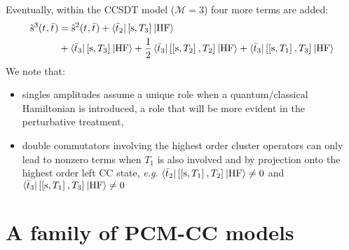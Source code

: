 Eventually, within the \acs{CCSDT} model ($\mathcal{M} = 3$) four more
terms are added:
\begin{equation}
  \begin{aligned}
  \tilde{\mathrm{s}}^3(t_{}, \bar{t}_{}) &=
  \tilde{\mathrm{s}}^2(t_{}, \bar{t}_{})
  + \braket{\bar{t}_{2} | \left[ \mathrm{s}, T_3 \right]^{} | \mathrm{HF}} \\
  &+ \braket{\bar{t}_{3} | \left[ \mathrm{s}, T_3 \right]^{} | \mathrm{HF}}
  + \frac{1}{2}
  \braket{\bar{t}_{3} | \left[ \left[ \mathrm{s}, T_2 \right]^{}, T_2 \right]^{} |
  \mathrm{HF}}
  + \braket{\bar{t}_{3} | \left[ \left[ \mathrm{s}, T_1 \right]^{}, T_3 \right]^{} |
  \mathrm{HF}}
  \end{aligned}
\end{equation}
We note that:
\begin{itemize}
  \item singles amplitudes assume a unique role when a quantum/classical
    Hamiltonian is introduced, a role that will be more evident in the
    perturbative treatment,
  \item double commutators involving the highest order cluster
    operators can only lead to nonzero terms when $T_1$ is also
    involved and by projection onto the highest order left \acs{CC}
    state, \emph{e.g.}
    $\braket{\bar{t}_{2} | \left[ \left[ \mathrm{s}, T_1 \right]^{}, T_2 \right]^{} |
    \mathrm{HF}} \neq 0$
    and
    $\braket{\bar{t}_{3} | \left[ \left[ \mathrm{s}, T_1 \right]^{}, T_3 \right]^{} |
    \mathrm{HF}} \neq 0$
\end{itemize}

\section{A family of PCM-CC models}\label{sec:pcm-cc-models}

